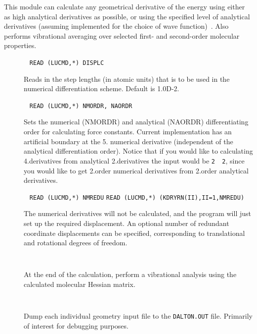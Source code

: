 This module can calculate any geometrical derivative of the energy
using either as high analytical derivatives as possible, or using the
specified level of analytical derivatives (assuming implemented for
the choice of wave function)~\cite{numder}. Also performs vibrational averaging over
selected first- and second-order molecular properties.

\begin{description}

\item[]\verb| |\newline
\verb|READ (LUCMD,*) DISPLC|

Reads in the step lengths (in atomic units) that is to be used in the
numerical differentiation scheme. Default is 1.0D-2.

\item[]\verb| |\newline
\verb|READ (LUCMD,*) NMORDR, NAORDR|

Sets the numerical (NMORDR) and analytical (NAORDR) differentiating
order for calculating force constants. Current implementation has an
artificial boundary at the 5. numerical derivative (independent of the
analytical differentiation order). Notice that if you would like to
calculating 4.derivatives from analytical 2.derivatives the input
would be \verb|2  2|, since you would like to get 2.order numerical
derivatives from 2.order analytical derivatives.

\item[]\verb| |\newline
\verb|READ (LUCMD,*) NMREDU|\newline
\verb|READ (LUCMD,*) (KDRYRN(II),II=1,NMREDU)|

The numerical derivatives will not be calculated, and the program will
just set up the required displacement. An optional number of redundant
coordinate displacements can be specified, corresponding to translational and
rotational degrees of freedom.

\item[]\verb| |\newline

At the end of the calculation, perform a vibrational analysis using
the calculated molecular Hessian matrix.

\item[]\verb| |\newline

Dump each individual geometry input file to the \verb|DALTON.OUT|
file. Primarily of interest for debugging purposes.


\end{description}
